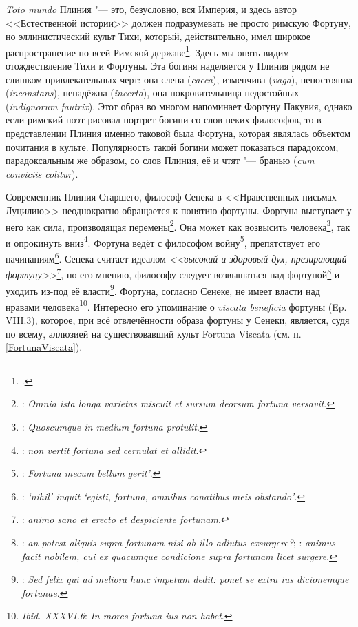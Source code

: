 \textit{Toto mundo} Плиния "--- это, безусловно, вся Империя, и здесь автор <<Естественной истории>> должен подразумевать не просто римскую Фортуну, но эллинистический культ Тихи, который, действительно, имел широкое распространение по всей Римской державе\footcite[P. 85--87]{Ferguson1970}. Здесь мы опять видим отождествление Тихи и Фортуны. Эта богиня наделяется у Плиния рядом не слишком привлекательных черт: она слепа (\textit{caeca}), изменчива (\textit{vaga}), непостоянна (\textit{inconstans}), ненадёжна (\textit{incerta}), она покровительница недостойных (\textit{indignorum fautrix}). Этот образ во многом напоминает Фортуну Пакувия, однако если римский поэт рисовал портрет богини со слов неких философов, то в представлении Плиния именно таковой была Фортуна, которая являлась объектом почитания в культе. Популярность такой богини может показаться парадоксом; парадоксальным же образом, со слов Плиния, её и чтят "--- бранью (\textit{cum conviciis colitur}).


Современник Плиния Старшего, философ Сенека в <<Нравственных письмах Луцилию>> неоднократно обращается к понятию фортуны. Фортуна выступает у него как сила, производящая перемены\footnote{: \textit{Omnia ista longa varietas miscuit et sursum deorsum fortuna versavit}. }. Она может как возвысить человека\footnote{: \textit{Quoscumque in medium fortuna protulit}.}, так и опрокинуть вниз\footnote{: \textit{non vertit fortuna sed cernulat et allidit}.}. Фортуна ведёт с философом войну\footnote{: \textit{Fortuna mecum bellum gerit'}.}, препятствует его начинаниям\footnote{: \textit{`nihil' inquit `egisti, fortuna, omnibus conatibus meis obstando'}.}. Сенека считает идеалом \textit{<<высокий и здоровый дух,  презирающий фортуну>>}\footnote{: \textit{animo sano et erecto et despiciente fortunam}.}, по его мнению, философу следует возвышаться над фортуной\footnote{: \textit{an potest aliquis supra fortunam nisi ab illo adiutus exsurgere?}; : \textit{animus facit nobilem, cui ex quacumque condicione supra fortunam licet surgere}.} и уходить из-под её власти\footnote{: \textit{Sed felix qui ad meliora hunc impetum dedit: ponet se extra ius dicionemque fortunae}.}. Фортуна, согласно Сенеке, не имеет власти над нравами человека\footnote{\textit{Ibid. XXXVI.6}: \textit{In mores fortuna ius non habet}.}. Интересно его упоминание о \textit{viscata beneficia}  фортуны (Ep. VIII.3), которое, при всё отвлечённости образа фортуны у Сенеки, является, судя по всему, аллюзией на существовавший культ Fortuna Viscata (см. п. \ref{FortunaViscata}).

